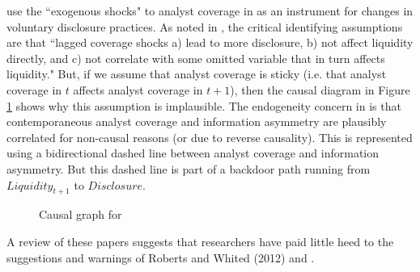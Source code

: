 \documentclass[11pt]{amsart}
\begin{document}
\citet{Balakrishnan:2014js} use the  ``exogenous shocks" to analyst coverage in \citet{Kelly:2012ih} as an instrument for changes in voluntary disclosure practices. As noted in \citet{Balakrishnan:2014js}, the critical identifying assumptions are that ``lagged coverage shocks a) lead to more disclosure, b) not affect liquidity directly, and c) not correlate with some omitted variable that in turn affects liquidity." But, if we assume that analyst coverage is sticky (i.e. that analyst coverage in $t$ affects analyst coverage in $t+1$), then the causal diagram in Figure \ref{fig:bbkl} shows why this assumption is implausible. 
The endogeneity concern in \citet{Kelly:2012ih}  is that contemporaneous analyst coverage and information asymmetry are plausibly correlated for non-causal reasons (or due to reverse causality). 
This is represented using a bidirectional dashed line between analyst coverage and information asymmetry.
But this dashed line is part of a backdoor path running from $\textit{Liquidity}_{t+1}$ to $\textit{Disclosure}$.

\begin{figure} \caption{Causal graph for \citet{Balakrishnan:2014js}} \label{fig:bbkl}
\end{figure}

A review of these papers suggests that researchers have paid little heed to the suggestions and warnings of Roberts and Whited (2012) and \citet{Larcker:2010fq}. 
\end{document}
